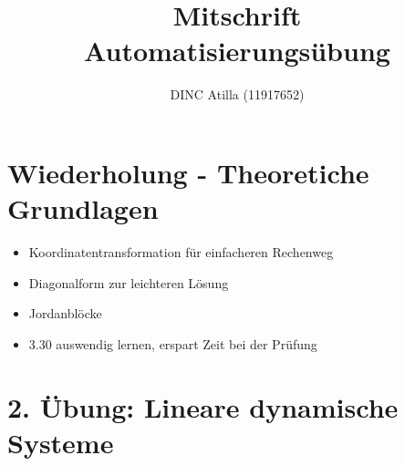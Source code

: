 \documentclass[a4paper]{article}
\title{Mitschrift\\Automatisierungsübung}
\author{DINC Atilla (11917652)}
\begin{document}
\normalsize
\maketitle

\section*{Wiederholung - Theoretiche Grundlagen}
\begin{itemize}
    \item Koordinatentransformation für einfacheren Rechenweg
    \item Diagonalform zur leichteren Lösung
    \item Jordanblöcke
    \item 3.30 auswendig lernen, erspart Zeit bei der Prüfung
\end{itemize}

\section*{2. Übung: Lineare dynamische Systeme}
\end{document}
